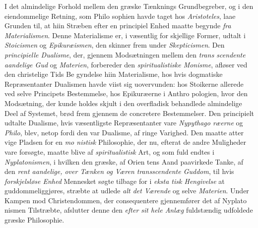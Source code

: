 I det almindelige Forhold mellem den græske Tænknings
Grundbegreber, og i den eiendommelige Retning, som Philo\-%
sophien havde taget hos \emph{Aristoteles}, laae Grunden til, at
hiin Stræben efter en principiel Enhed maatte begynde \emph{fra
Materialismen}. Denne Materialisme er, i væsentlig for\-%
skjellige Former, udtalt i \emph{Stoicismen} og \emph{Epikuræismen},
den skinner frem under \emph{Skepticismen}. Den \emph{principielle
Dualisme}, der, gjennem Modsætningen mellem den \emph{trans\-%
scendente aandelige Gud} og \emph{Materien}, forbereder den
\emph{spiritualistiske Monisme}, afløser ved den christelige Tids Be\-%
gyndelse hiin Materialisme, hos hvis dogmatiske Repræsentanter
Dualismen havde viist sig uovervunden: hos Stoikerne allerede
ved selve Principets Bestemmelse, hos Epikuræerne i Anthro\-%
pologien, hvor den Modsætning, der kunde holdes skjult i den
overfladisk behandlede almindelige Deel af Systemet, brød frem
gjennem de concretere Bestemmelser. Den principielt udtalte
Dualisme, hvis væsentligste Repræsentanter vare \emph{Nypythago\-%
ræerne} og \emph{Philo}, blev, netop fordi den var Dualisme, af
ringe Varighed. Den maatte atter vige Pladsen for en \emph{mo\-%
nistisk} Philosophie, der nu, efterat de andre Muligheder vare
forsøgte, maatte blive af \emph{spiritualistisk} Art, og som fuld\-%
endtes i \emph{Nyplatonismen}, i hvilken den græske, af Orien\-%
tens Aand paavirkede Tanke, af den \emph{rent aandelige, over
Tænken og Væren transscendente Guddom}, til hvis
\emph{forskjelsløse Enhed} Mennesket søgte tilbage for i \emph{eksta\-%
tisk Hengivelse} at guddommeliggjøres, stræbte at udlede
\emph{alt det Værende} og selve \emph{Materien}. Under Kampen mod
Christendommen, der consequentere gjennemfører det af Nyplato\-%
nismen Tilstræbte, afslutter denne den \emph{efter sit hele Anlæg}
fuldstændig udfoldede græske Philosophie.

